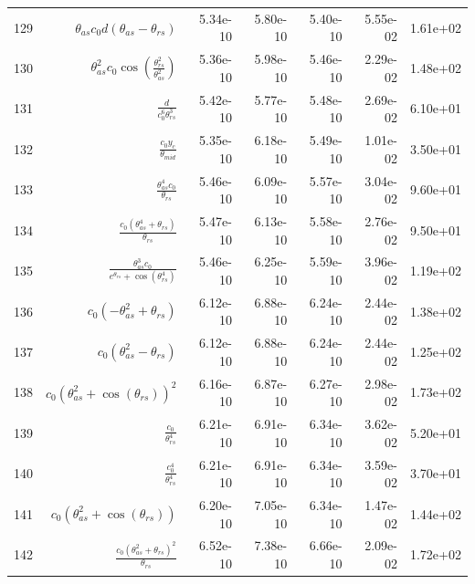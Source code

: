 \begin{tabularx}{\textwidth}{lRRRRRl}
129  &  $ \theta_{as} c_{0} d \left(\theta_{as} - \theta_{rs}\right) $  &  5.34e-10  &  5.80e-10  &  5.40e-10  &  5.55e-02  &  1.61e+02  \\ 
130  &  $ \theta_{as}^{2} c_{0} \cos{\left(\displaystyle\frac{\theta_{rs}^{2}}{\theta_{as}^{2}} \right)} $  &  5.36e-10  &  5.98e-10  &  5.46e-10  &  2.29e-02  &  1.48e+02  \\ 
131  &  $ \displaystyle\frac{d}{c_{0}^{6} \theta_{rs}^{3}} $  &  5.42e-10  &  5.77e-10  &  5.48e-10  &  2.69e-02  &  6.10e+01  \\ 
132  &  $ \displaystyle\frac{c_{0} y_c}{\theta_{mid}} $  &  5.35e-10  &  6.18e-10  &  5.49e-10  &  1.01e-02  &  3.50e+01  \\ 
133  &  $ \displaystyle\frac{\theta_{as}^{4} c_{0}}{\theta_{rs}} $  &  5.46e-10  &  6.09e-10  &  5.57e-10  &  3.04e-02  &  9.60e+01  \\ 
134  &  $ \displaystyle\frac{c_{0} \left(\theta_{as}^{4} + \theta_{rs}\right)}{\theta_{rs}} $  &  5.47e-10  &  6.13e-10  &  5.58e-10  &  2.76e-02  &  9.50e+01  \\ 
135  &  $ \displaystyle\frac{\theta_{as}^{3} c_{0}}{e^{\theta_{rs}} + \cos{\left(\theta_{rs}^{4} \right)}} $  &  5.46e-10  &  6.25e-10  &  5.59e-10  &  3.96e-02  &  1.19e+02  \\ 
136  &  $ c_{0} \left(- \theta_{as}^{2} + \theta_{rs}\right) $  &  6.12e-10  &  6.88e-10  &  6.24e-10  &  2.44e-02  &  1.38e+02  \\ 
137  &  $ c_{0} \left(\theta_{as}^{2} - \theta_{rs}\right) $  &  6.12e-10  &  6.88e-10  &  6.24e-10  &  2.44e-02  &  1.25e+02  \\ 
138  &  $ c_{0} \left(\theta_{as}^{2} + \cos{\left(\theta_{rs} \right)}\right)^{2} $  &  6.16e-10  &  6.87e-10  &  6.27e-10  &  2.98e-02  &  1.73e+02  \\ 
139  &  $ \displaystyle\frac{c_{0}}{\theta_{rs}^{4}} $  &  6.21e-10  &  6.91e-10  &  6.34e-10  &  3.62e-02  &  5.20e+01  \\ 
140  &  $ \displaystyle\frac{c_{0}^{4}}{\theta_{rs}^{4}} $  &  6.21e-10  &  6.91e-10  &  6.34e-10  &  3.59e-02  &  3.70e+01  \\ 
141  &  $ c_{0} \left(\theta_{as}^{2} + \cos{\left(\theta_{rs} \right)}\right) $  &  6.20e-10  &  7.05e-10  &  6.34e-10  &  1.47e-02  &  1.44e+02  \\ 
142  &  $ \displaystyle\frac{c_{0} \left(\theta_{as}^{2} + \theta_{rs}\right)^{2}}{\theta_{rs}} $  &  6.52e-10  &  7.38e-10  &  6.66e-10  &  2.09e-02  &  1.72e+02  \\ 

\end{tabularx}
